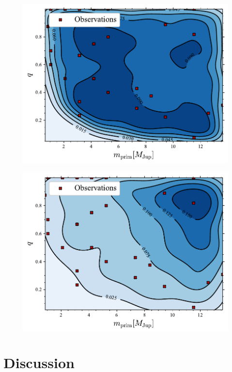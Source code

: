 \documentclass[aa]{aa}
\begin{document}
\begin{figure}
    \centering
        \includegraphics[width=.91\columnwidth]{figures/mass_distr_Plummer_rvir0.5.pdf}
        \caption{}
         \label{Fig:Plummer_massfunction}
\end{figure}
\begin{figure}
    \centering
        \includegraphics[width=.91\columnwidth]{figures/mass_distr_Fractal_rvir0.5.pdf}
        \caption{}
         \label{Fig:fractal_massfunction}
\end{figure}



  


\section{Discussion}
\end{document}
